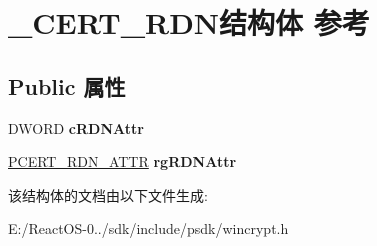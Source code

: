 \hypertarget{struct___c_e_r_t___r_d_n}{}\section{\+\_\+\+C\+E\+R\+T\+\_\+\+R\+D\+N结构体 参考}
\label{struct___c_e_r_t___r_d_n}
\subsection*{Public 属性}
\begin{DoxyCompactItemize}
\item 
\mbox{\label{struct___c_e_r_t___r_d_n_a1dc17ca193b8b434eb753449b64bde7b}} 
D\+W\+O\+RD {\bfseries c\+R\+D\+N\+Attr}
\item 
\mbox{\label{struct___c_e_r_t___r_d_n_ac70c040266c01e08d03ff8249bc994e0}} 
\hyperlink{struct___c_e_r_t___r_d_n___a_t_t_r}{P\+C\+E\+R\+T\+\_\+\+R\+D\+N\+\_\+\+A\+T\+TR} {\bfseries rg\+R\+D\+N\+Attr}
\end{DoxyCompactItemize}


该结构体的文档由以下文件生成\+:\begin{DoxyCompactItemize}
\item 
E\+:/\+React\+O\+S-\/0../sdk/include/psdk/wincrypt.\+h\end{DoxyCompactItemize}
